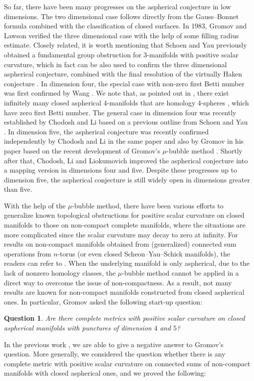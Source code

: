 \documentclass[11pt, reqno]{amsart}
\numberwithin{equation}{section}
\newtheorem{question}[theorem]{Question}
\theoremstyle{definition}
\begin{document}
So far, there have been many progresses on the aspherical conjecture in low dimensions. The two dimensional case follows directly from the Gauss--Bonnet formula combined with the classification of closed surfaces. In 1983, Gromov and Lawson \cite{GL83} verified the three dimensional case with the help of some filling radius estimate. Closely related, it is worth mentioning that Schoen and Yau \cite{SY79c} previously obtained a fundamental group obstruction for 3-manifolds with positive scalar curvature, which in fact can be also used to confirm the three dimensional aspherical conjecture, combined with the final resolution of the virtually Haken conjecture \cite{A13}. In dimension four, the special case with non-zero first Betti number was first confirmed by Wang \cite{Wang19}. We note that, as pointed out in \cite{Wang19}, there exist infinitely many closed aspherical 4-manifolds that are homology 4-spheres \cite{RT05}, which have zero first Betti number. The general case in dimension four was recently established by Chodosh and Li \cite{CL20} based on a previous outline from Schoen and Yau \cite{SY87}. In dimension five, the aspherical conjecture was recently confirmed independently by Chodosh and Li in the same paper \cite{CL20} and also by Gromov in his paper \cite{Gro20} based on the recent development of Gromov's $\mu$-bubble method \cite{Gro19}. Shortly after that, Chodosh, Li and Liokumovich \cite{CLL23} improved the aspherical conjecture into a mapping version in dimensions four and five. Despite these progresses up to dimension five, the aspherical conjecture is still widely open in dimensions greater than five.

With the help of the $\mu$-bubble
method, there have been various efforts to generalize known topological obstructions for positive scalar curvature on closed manifolds to those on non-compact complete manifolds, where the situations are more complicated since the scalar curvature may decay to zero at infinity.
For results on non-compact manifolds obtained from (generalized) connected sum operations from $n$-torus (or even closed Scheon--Yau--Schick manifolds), the readers can refer to \cite{CL20,LUY20,CLSZ21,Chen24}. When the underlying manifold is only aspherical, due to the lack of nonzero homology classes, the $\mu$-bubble method cannot be applied in a direct way to overcome the issue of non-compactness. As a result, not many results are known for non-compact manifolds constructed from closed aspherical ones. In particular,
Gromov \cite[p. 151]{Gro19} asked the following start-up question:
\begin{question}
Are there complete metrics with positive scalar curvature on closed aspherical manifolds with punctures of dimension $4$ and $5$?
\end{question}
In the previous work \cite{CCZ23}, we are able to give a negative answer to Gromov's question. More generally, we considered the question whether there is any complete metric with positive scalar curvature on connected sums of non-compact manifolds with closed aspherical ones, and we proved the following:
\end{document}
